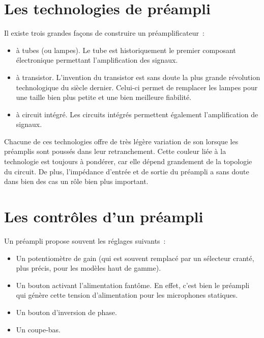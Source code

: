 \documentclass[
]{book}
\providecommand{\tightlist}{%
  \setlength{\itemsep}{0pt}\setlength{\parskip}{0pt}}
\begin{document}
\hypertarget{les-technologies-de-pruxe9ampli}{%
\section{Les technologies de préampli}\label{les-technologies-de-pruxe9ampli}}

Il existe trois grandes façons de construire un préamplificateur~:

\begin{itemize}
\tightlist
\item
  à tubes (ou lampes). Le tube est historiquement le premier composant électronique permettant l'amplification des signaux.
\item
  à transistor. L'invention du transistor est sans doute la plus grande révolution technologique du siècle dernier. Celui-ci permet de remplacer les lampes pour une taille bien plus petite et une bien meilleure fiabilité.
\item
  à circuit intégré. Les circuits intégrés permettent également l'amplification de signaux.
\end{itemize}

Chacune de ces technologies offre de très légère variation de son lorsque les préamplis sont poussés dans leur retranchement. Cette couleur liée à la technologie est toujours à pondérer, car elle dépend grandement de la topologie du circuit. De plus, l'impédance d'entrée et de sortie du préampli a sans doute dans bien des cas un rôle bien plus important.

\hypertarget{les-contruxf4les-dun-pruxe9ampli}{%
\section{Les contrôles d'un préampli}\label{les-contruxf4les-dun-pruxe9ampli}}

Un préampli propose souvent les réglages suivants~:

\begin{itemize}
\tightlist
\item
  Un potentiomètre de gain (qui est souvent remplacé par un sélecteur cranté, plus précis, pour les modèles haut de gamme).
\item
  Un bouton activant l'alimentation fantôme. En effet, c'est bien le préampli qui génère cette tension d'alimentation pour les microphones statiques.
\item
  Un bouton d'inversion de phase.
\item
  Un coupe-bas.
\end{itemize}
\end{document}
